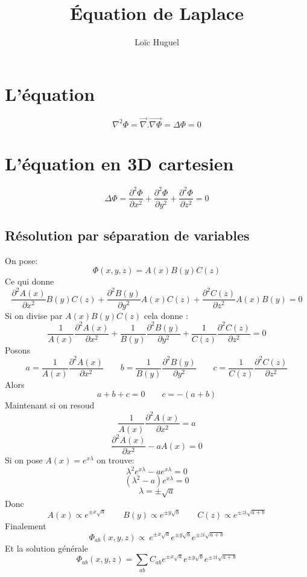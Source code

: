 \documentclass[12pt,a4paper]{article}
\title{Équation de Laplace}
\author{Loïc Huguel}
\begin{document}
	\maketitle
	
	\tableofcontents
	
	\newpage
	\section{L'équation}
	
	\[
	\nabla^2 \Phi=\overrightarrow{\nabla}.\overrightarrow{\nabla \Phi}= \Delta \Phi =0
	\]
	
	\section{L'équation en 3D cartesien}
	
	\[
	\Delta \Phi = \frac{\partial^2 \Phi}{\partial x^2}+\frac{\partial^2 \Phi}{\partial y^2}+\frac{\partial^2 \Phi}{\partial z^2}=0
	\]
	
	\subsection{Résolution par séparation de variables}
	
	On pose:
	\[
		\Phi(x,y,z)=A(x) B(y) C(z)
	\]
	Ce qui donne 
	\[
	\frac{\partial^2 A(x)}{\partial x^2}B(y)C(z)+\frac{\partial^2 B(y)}{\partial y^2}A(x)C(z)+\frac{\partial^2 C(z)}{\partial z^2}A(x)B(y)=0
	\]
	Si on divise par $A(x) B(y) C(z)$ cela donne :	
	\[
	\frac{1}{A(x)}\frac{\partial^2 A(x)}{\partial x^2}+\frac{1}{B(y)}\frac{\partial^2 B(y)}{\partial y^2}+\frac{1}{C(z)}\frac{\partial^2 C(z)}{\partial z^2}=0
	\]
	Posons 
	\[
		a=\frac{1}{A(x)}\frac{\partial^2 A(x)}{\partial x^2}\qquad
		b=\frac{1}{B(y)}\frac{\partial^2 B(y)}{\partial y^2}\qquad
		c=\frac{1}{C(z)}\frac{\partial^2 C(z)}{\partial z^2}
	\]
	Alors 
	\[
		a+b+c=0 \qquad c=-(a+b)
	\]
	Maintenant si on resoud
	\[
	\frac{1}{A(x)}\frac{\partial^2 A(x)}{\partial x^2}=a
	\] 
	\[
	\frac{\partial^2 A(x)}{\partial x^2}- a A(x) = 0
	\] 
	Si on pose $A(x)=e^{x\lambda}$ on trouve:
	\[
	\lambda^2 e^{x\lambda}- a e^{x\lambda} = 0
	\]
	\[
	\left(\lambda^2 - a \right)e^{x\lambda} = 0
	\]
	\[
		\lambda = \pm \sqrt{a}
	\]
	Donc
	\[
		A(x)\propto e^{\pm x \sqrt{a}} \qquad B(y)\propto e^{\pm y \sqrt{b}} \qquad C(z)\propto e^{\pm z i \sqrt{a+b}}
	\]
	Finalement
	\[
		\boxed{\Phi_{ab}(x,y,z) \propto \ e^{\pm x \sqrt{a}} e^{\pm y \sqrt{b}} e^{\pm z i \sqrt{a+b}}}
	\]
	Et la solution générale
	\[
	\boxed{\Phi_{ab}(x,y,z)=\sum_{ab} C_{ab} e^{\pm x \sqrt{a}} e^{\pm y \sqrt{b}} e^{\pm z i \sqrt{a+b}}}
	\]
	
\end{document}
